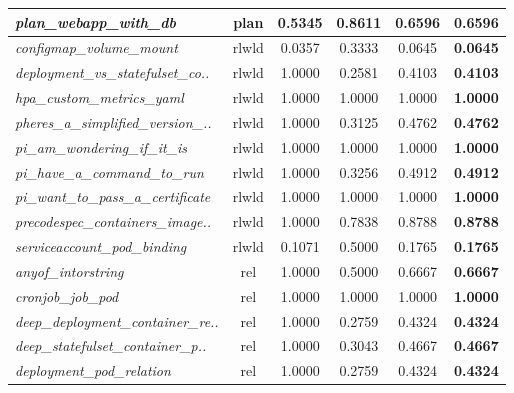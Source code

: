 \begin{footnotesize}
\begin{longtable}{|p{3.6cm}|c|c|c|c|c|}
\hline
\textit{plan\_\allowbreak{}webapp\_\allowbreak{}with\_\allowbreak{}db} & plan & 0.5345 & 0.8611 & 0.6596 & \textbf{0.6596} \\
\hline
\textit{configmap\_\allowbreak{}volume\_\allowbreak{}mount} & rlwld & 0.0357 & 0.3333 & 0.0645 & \textbf{0.0645} \\
\hline
\textit{deployment\_\allowbreak{}vs\_\allowbreak{}statefulset\_\allowbreak{}co..} & rlwld & 1.0000 & 0.2581 & 0.4103 & \textbf{0.4103} \\
\hline
\textit{hpa\_\allowbreak{}custom\_\allowbreak{}metrics\_\allowbreak{}yaml} & rlwld & 1.0000 & 1.0000 & 1.0000 & \textbf{1.0000} \\
\hline
\textit{pheres\_\allowbreak{}a\_\allowbreak{}simplified\_\allowbreak{}version\_\allowbreak{}..} & rlwld & 1.0000 & 0.3125 & 0.4762 & \textbf{0.4762} \\
\hline
\textit{pi\_\allowbreak{}am\_\allowbreak{}wondering\_\allowbreak{}if\_\allowbreak{}it\_\allowbreak{}is} & rlwld & 1.0000 & 1.0000 & 1.0000 & \textbf{1.0000} \\
\hline
\textit{pi\_\allowbreak{}have\_\allowbreak{}a\_\allowbreak{}command\_\allowbreak{}to\_\allowbreak{}run} & rlwld & 1.0000 & 0.3256 & 0.4912 & \textbf{0.4912} \\
\hline
\textit{pi\_\allowbreak{}want\_\allowbreak{}to\_\allowbreak{}pass\_\allowbreak{}a\_\allowbreak{}certificate} & rlwld & 1.0000 & 1.0000 & 1.0000 & \textbf{1.0000} \\
\hline
\textit{precodespec\_\allowbreak{}containers\_\allowbreak{}image..} & rlwld & 1.0000 & 0.7838 & 0.8788 & \textbf{0.8788} \\
\hline
\textit{serviceaccount\_\allowbreak{}pod\_\allowbreak{}binding} & rlwld & 0.1071 & 0.5000 & 0.1765 & \textbf{0.1765} \\
\hline
\textit{anyof\_\allowbreak{}intorstring} & rel & 1.0000 & 0.5000 & 0.6667 & \textbf{0.6667} \\
\hline
\textit{cronjob\_\allowbreak{}job\_\allowbreak{}pod} & rel & 1.0000 & 1.0000 & 1.0000 & \textbf{1.0000} \\
\hline
\textit{deep\_\allowbreak{}deployment\_\allowbreak{}container\_\allowbreak{}re..} & rel & 1.0000 & 0.2759 & 0.4324 & \textbf{0.4324} \\
\hline
\textit{deep\_\allowbreak{}statefulset\_\allowbreak{}container\_\allowbreak{}p..} & rel & 1.0000 & 0.3043 & 0.4667 & \textbf{0.4667} \\
\hline
\textit{deployment\_\allowbreak{}pod\_\allowbreak{}relation} & rel & 1.0000 & 0.2759 & 0.4324 & \textbf{0.4324} \\

\end{longtable}
\end{footnotesize}
